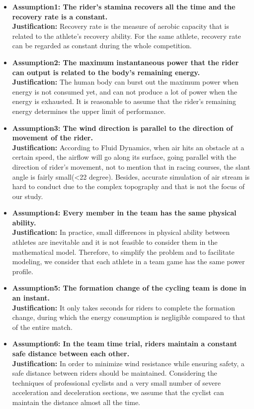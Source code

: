 \documentclass{mcmthesis}
\begin{document}
\begin{itemize}
	\item {\bf Assumption1: The rider's stamina recovers all the time and the recovery rate is a constant.}\\
	{\bf Justification:} Recovery rate is the measure of aerobic capacity that is related to the athlete's recovery ability. For the same athlete, recovery rate can be regarded as constant during the whole competition.
	
	\item {\bf Assumption2: The maximum instantaneous power that the rider can output is related to the body's remaining energy. }\\
	{\bf Justification:} The human body can burst out the maximum power when energy is not consumed yet, and can not produce a lot of power when the energy is exhausted. It is reasonable to assume that the rider's remaining energy determines the upper limit of performance.
	
	\item {\bf Assumption3: The wind direction is parallel to the direction of movement of the rider.} \\
	{\bf Justification:} According to Fluid Dynamics, when air hits an obstacle at a certain speed, the airflow will go along its surface, going parallel with the direction of rider's movement, not to mention that in racing courses, the slant angle is fairly small(<22 degree). Besides, accurate simulation of air stream is hard to conduct due to the complex topography and that is not the focus of our study.
	
	\item {\bf Assumption4: Every member in the team has the same physical ability.} \\
	{\bf Justification:} In practice, small differences in physical ability between athletes are inevitable and it is not feasible to consider them in the mathematical model. Therefore, to simplify the problem and to facilitate modeling, we consider that each athlete in a team game has the same power profile.
	
	\item {\bf Assumption5: The formation change of the cycling team is done in an instant.}\\
	{\bf Justification:} It only takes seconds for riders to complete the formation change, during which the energy consumption is negligible compared to that of the entire match.
	
	\item {\bf Assumption6: In the team time trial, riders maintain a constant safe distance between each other.} \\
	{\bf Justification:} In order to minimize wind resistance while ensuring safety, a safe distance between riders should be maintained. Considering the techniques of professional cyclists and a very small number of severe acceleration and deceleration sections, we assume that the cyclist can maintain the distance almost all the time.
	

\end{itemize}
\end{document}
